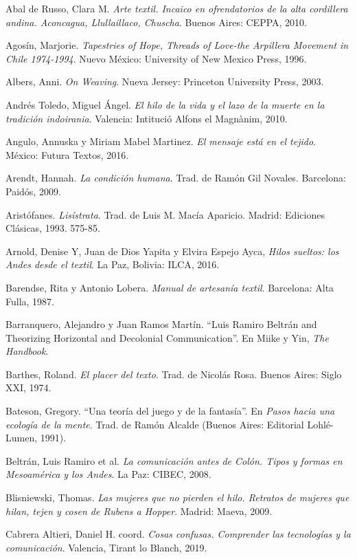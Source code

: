 \documentclass{tufte-handout}
\begin{document}
\begin{hangparas}{.25in}{1} 



Abal de Russo, Clara M. \emph{Arte textil. Incaico en ofrendatorios de
la alta cordillera andina. Aconcagua, Llullaillaco, Chuscha}. Buenos
Aires: CEPPA, 2010.

Agosín, Marjorie. \emph{Tapestries of Hope, Threads of Love-the
Arpillera Movement in Chile 1974-1994}. Nuevo México: University of New
Mexico Press, 1996.

Albers, Anni. \emph{On Weaving}. Nueva Jersey: Princeton University
Press, 2003.

Andrés Toledo, Miguel Ángel. \emph{El hilo de la vida y el lazo de la
muerte en la tradición indoirania}. Valencia: Intitució Alfons el
Magnànim, 2010.

Angulo, Annuska y Miriam Mabel Martinez. \emph{El mensaje está en el
tejido}. México: Futura Textos, 2016.

Arendt, Hannah. \emph{La condición humana}. Trad. de Ramón Gil Novales.
Barcelona: Paidós, 2009.

Aristófanes. \emph{Lisístrata}. Trad. de Luis M. Macía Aparicio. Madrid:
Ediciones Clásicas, 1993. 575-85.

Arnold, Denise Y, Juan de Dios Yapita y Elvira Espejo Ayca, \emph{Hilos
sueltos: los Andes desde el textil}. La Paz, Bolivia: ILCA, 2016.

Barendse, Rita y Antonio Lobera. \emph{Manual de artesanía textil}.
Barcelona: Alta Fulla, 1987.

Barranquero, Alejandro y Juan Ramos Martín. ``Luis Ramiro Beltrán and
Theorizing Horizontal and Decolonial Communication''. En Miike y Yin,
\emph{The Handbook}.

Barthes, Roland. \emph{El placer del texto}. Trad. de Nicolás Rosa.
Buenos Aires: Siglo XXI, 1974.

Bateson, Gregory. ``Una teoría del juego y de la fantasía''. En
\emph{Pasos hacia una ecología de la mente}. Trad. de Ramón Alcalde
(Buenos Aires: Editorial Lohlé-Lumen, 1991).

Beltrán, Luis Ramiro et al. \emph{La comunicación antes de Colón. Tipos
y formas en Mesoamérica y los Andes}. La Paz: CIBEC, 2008.

Blisniewski, Thomas. \emph{Las mujeres que no pierden el hilo. Retratos
de mujeres que hilan, tejen y cosen de Rubens a Hopper}. Madrid: Maeva,
2009.

Cabrera Altieri, Daniel H. coord. \emph{Cosas confusas. Comprender las
tecnologías y la comunicación}. Valencia, Tirant lo Blanch, 2019.


\end{hangparas}
\end{document}
